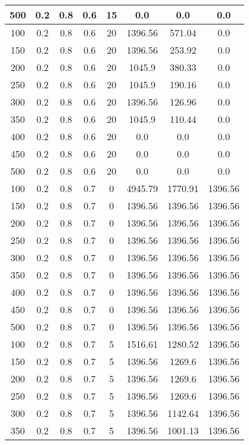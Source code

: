 \documentclass[a4paper, 12pt]{extreport}
\begin{document}
\begin{itemize}
\begin{longtable}{|c|c|c|c|c|c|c|c|}
			500 & 0.2 & 0.8 & 0.6 & 15 & 0.0 & 0.0 & 0.0 \\\hline
			100 & 0.2 & 0.8 & 0.6 & 20 & 1396.56 & 571.04 & 0.0 \\\hline
			150 & 0.2 & 0.8 & 0.6 & 20 & 1396.56 & 253.92 & 0.0 \\\hline
			200 & 0.2 & 0.8 & 0.6 & 20 & 1045.9 & 380.33 & 0.0 \\\hline
			250 & 0.2 & 0.8 & 0.6 & 20 & 1045.9 & 190.16 & 0.0 \\\hline
			300 & 0.2 & 0.8 & 0.6 & 20 & 1396.56 & 126.96 & 0.0 \\\hline
			350 & 0.2 & 0.8 & 0.6 & 20 & 1045.9 & 110.44 & 0.0 \\\hline
			400 & 0.2 & 0.8 & 0.6 & 20 & 0.0 & 0.0 & 0.0 \\\hline
			450 & 0.2 & 0.8 & 0.6 & 20 & 0.0 & 0.0 & 0.0 \\\hline
			500 & 0.2 & 0.8 & 0.6 & 20 & 0.0 & 0.0 & 0.0 \\\hline
			100 & 0.2 & 0.8 & 0.7 & 0 & 4945.79 & 1770.91 & 1396.56 \\\hline
			150 & 0.2 & 0.8 & 0.7 & 0 & 1396.56 & 1396.56 & 1396.56 \\\hline
			200 & 0.2 & 0.8 & 0.7 & 0 & 1396.56 & 1396.56 & 1396.56 \\\hline
			250 & 0.2 & 0.8 & 0.7 & 0 & 1396.56 & 1396.56 & 1396.56 \\\hline
			300 & 0.2 & 0.8 & 0.7 & 0 & 1396.56 & 1396.56 & 1396.56 \\\hline
			350 & 0.2 & 0.8 & 0.7 & 0 & 1396.56 & 1396.56 & 1396.56 \\\hline
			400 & 0.2 & 0.8 & 0.7 & 0 & 1396.56 & 1396.56 & 1396.56 \\\hline
			450 & 0.2 & 0.8 & 0.7 & 0 & 1396.56 & 1396.56 & 1396.56 \\\hline
			500 & 0.2 & 0.8 & 0.7 & 0 & 1396.56 & 1396.56 & 1396.56 \\\hline
			100 & 0.2 & 0.8 & 0.7 & 5 & 1516.61 & 1280.52 & 1396.56 \\\hline
			150 & 0.2 & 0.8 & 0.7 & 5 & 1396.56 & 1269.6 & 1396.56 \\\hline
			200 & 0.2 & 0.8 & 0.7 & 5 & 1396.56 & 1269.6 & 1396.56 \\\hline
			250 & 0.2 & 0.8 & 0.7 & 5 & 1396.56 & 1269.6 & 1396.56 \\\hline
			300 & 0.2 & 0.8 & 0.7 & 5 & 1396.56 & 1142.64 & 1396.56 \\\hline
			350 & 0.2 & 0.8 & 0.7 & 5 & 1396.56 & 1001.13 & 1396.56 \\\hline

\end{longtable}
\end{itemize}
\end{document}
